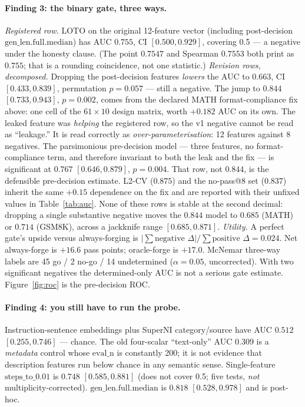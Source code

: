 \paragraph{Finding 3: the binary gate, three ways.}
\textit{Registered row.} LOTO on the original 12-feature vector
(including post-decision $\mathrm{gen\_len.full.median}$) has AUC
$0.755$, CI $[0.500,0.929]$, covering 0.5 --- a negative under the
honesty clause.
(The point $0.7547$ and Spearman $0.7553$ both print as $0.755$;
that is a rounding coincidence, not one statistic.)
\textit{Revision rows, decomposed.} Dropping the post-decision
features \emph{lowers} the AUC to $0.663$, CI $[0.433,0.839]$,
permutation $p{=}0.057$ --- still a negative. The jump to $0.844$
$[0.733,0.943]$, $p{=}0.002$, comes from the declared MATH
format-compliance fix above: one cell of the $61\times 10$ design
matrix, worth $+0.182$ AUC on its own.
The leaked feature was \emph{helping} the registered row, so the
v1 negative cannot be read as ``leakage.''
It is read correctly as \emph{over-parameterisation}: 12 features
against 8 negatives. The parsimonious pre-decision model ---
three features, no format-compliance term, and therefore invariant
to both the leak and the fix --- is significant at $0.767$
$[0.646,0.879]$, $p{=}0.004$.
That row, not $0.844$, is the defensible pre-decision estimate.
L2-CV ($0.875$) and the no-pass@8 set ($0.837$) inherit the same
$+0.15$ dependence on the fix and are reported with their
unfixed values in Table~\ref{tab:auc}.
None of these rows is stable at the second decimal: dropping a
single substantive negative moves the $0.844$ model to $0.685$
(MATH) or $0.714$ (GSM8K), across a jackknife range
$[0.685,0.871]$.
\textit{Utility.} A perfect gate's upside versus always-forging is
$|\sum \text{negative }\Delta|/\sum \text{positive }\Delta = 0.024$.
Net always-forge is $+16.6$ pass points; oracle-forge is $+17.0$.
McNemar three-way labels are 45 go / 2 no-go / 14 undetermined
($\alpha{=}0.05$, uncorrected). With two significant negatives the
determined-only AUC is not a serious gate estimate.
Figure~\ref{fig:roc} is the pre-decision ROC.

\paragraph{Finding 4: you still have to run the probe.}
Instruction-sentence embeddings plus SuperNI category/source have
AUC $0.512$ $[0.255,0.746]$ --- chance.
The old four-scalar ``text-only'' AUC $0.309$ is a
\emph{metadata} control whose $\mathrm{eval\_n}$ is constantly 200;
it is not evidence that description features run below chance in
any semantic sense.
Single-feature $\mathrm{steps\_to\_0.01}$ is $0.748$
$[0.585,0.881]$ (does not cover 0.5; five tests, \emph{not}
multiplicity-corrected).
$\mathrm{gen\_len.full.median}$ is $0.818$ $[0.528,0.978]$ and is
post-hoc.


